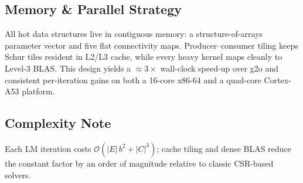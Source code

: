 \subsection{Memory \& Parallel Strategy}
All hot data structures live in contiguous memory: a structure-of-arrays parameter vector and five flat connectivity 
maps.  Producer–consumer tiling keeps Schur tiles resident in L2/L3 cache, while every heavy kernel maps cleanly to 
Level-3 BLAS.  This design yields a \mbox{$\approx\!3\times$} wall-clock speed-up over g2o and consistent per-iteration 
gains on both a 16-core x86-64 and a quad-core Cortex-A53 platform.

\subsection{Complexity Note}
Each LM iteration costs $\mathcal{O}(|E|\,b^{2}+|C|^{3})$; cache tiling and dense BLAS reduce the constant factor 
by an order of magnitude relative to classic CSR-based solvers.

